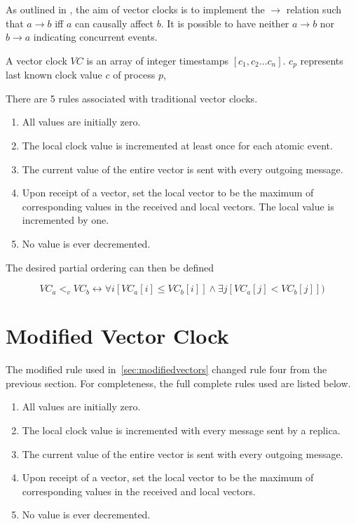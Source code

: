\documentclass[12pt,a4paper,twoside,openright]{report}
\begin{document}
As outlined in \cite{fidge1987}, the aim of vector clocks is to implement the $\rightarrow$ relation such that $ a \rightarrow b$ iff $a$ can causally affect $b$. It is possible to have neither $a \rightarrow b$ nor $b \rightarrow a$ indicating concurrent events.

A vector clock $VC$ is an array of integer timestamps $[c_1, c_2...c_n]$. $c_p$ represents last known clock value $c$ of process $p$, 

There are 5 rules associated with traditional vector clocks.
\begin{enumerate}
	\item All values are initially zero.
	\item The local clock value is incremented at least once for each atomic event.
	\item The current value of the entire vector is sent with every outgoing message.
	\item Upon receipt of a vector, set the local vector to be the maximum of corresponding values in the received and local vectors. The local value is incremented by one.
	\item No value is ever decremented.
\end{enumerate}

The desired partial ordering can then be defined

\[VC_a <_v VC_b \leftrightarrow \forall i[VC_a[i] \leq VC_b[i]] \land \exists j[VC_a[j] < VC_b[j]])\]



\section{Modified Vector Clock}
\label{appendix:modifiedvector}

The modified rule used in~\cref{sec:modifiedvectors} changed rule four from the previous section. For completeness, the full complete rules used are listed below.

\begin{enumerate}
	\item All values are initially zero.
	\item The local clock value is incremented with every message sent by a replica.
	\item The current value of the entire vector is sent with every outgoing message.
	\item Upon receipt of a vector, set the local vector to be the maximum of corresponding values in the received and local vectors.
	\item No value is ever decremented.
\end{enumerate}
\end{document}
